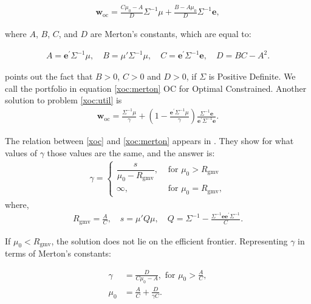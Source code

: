 \documentclass[12pt,oneside,a4paper]{memoir}
\begin{document}
\vspace{-1 em}
\begin{align}
	\label{xoc:merton}
\mathbf{w}_{\mathrm{oc}} = \frac{C \mu_0 - A }{D}\Sigma^{-1} \mu +
\frac{B - A \mu_0}{D}\Sigma^{-1} \mathbf{e},
\end{align}

\noindent 
where $A$, $B$, $C$, and $D$ are Merton's constants, which are equal to:

\begin{align}
	\label{merton:cte}
	A = \mathbf{e}^{\prime}\Sigma^{-1}\mu, \quad
	B = \mu'\Sigma^{-1}\mu,\quad
	C = \mathbf{e}^{\prime}\Sigma^{-1}\mathbf{e}, \quad
	D = BC - A^2.
\end{align}

\noindent
\cite[p. 1853]{merton1972} points out the fact that $B>0$, $C>0$ and $D>0$, if $\Sigma$ is Positive Definite. We call the portfolio in equation \eqref{xoc:merton} OC for Optimal Constrained. Another solution to problem \eqref{xoc:util} is
\begin{align}
	\label{xoc}
 \mathbf{w}_{\mathrm{oc}} = \frac{\Sigma^{-1}\mu}{\gamma} + 
	\left(1 - \frac{ \mathbf{e}^{\prime}\Sigma^{-1}\mu}{\gamma}
	\right)
	\frac{\Sigma^{-1} \mathbf{e}}{ \mathbf{e}^{\prime}\Sigma^{-1} \mathbf{e}}.
\end{align}

The relation between \eqref{xoc} and \eqref{xoc:merton} appears in . They show for what values of $\gamma$ those values are the same, and the answer is:
\begin{align}
	\label{gamma:bodnar}
\gamma = 
	\begin{cases}
		\dfrac{s}{\mu_0 - R_{\mathrm{gmv}}}, &\text{ for } \mu_0 > R_{\mathrm{gmv}}
		\\
		\infty, & \text{ for } \mu_0 = R_{\mathrm{gmv}},
	\end{cases}
\end{align}
where,
\begin{align}
R_{\mathrm{gmv}}=\frac{A}{C}, \quad s = \mu'Q\mu, \quad Q = \Sigma^{-1} - \frac{\Sigma^{-1} \mathbf{e} \mathbf{e}^{\prime}\Sigma^{-1}}{C}.
\end{align}
 
\noindent If $\mu_0 <  R_{\mathrm{gmv}}$, the solution does not lie on the efficient frontier.  Representing $\gamma$ in terms of Merton's constants:

\vspace{-2 em}
\begin{align}
\gamma &= \frac{D}{C \mu_0 - A}, \text{ for }   \mu_0 >\frac{A}{C},
\\
\mu_0 &= \frac{A}{C} + \frac{D}{\gamma C}.
\end{align}
\end{document}
